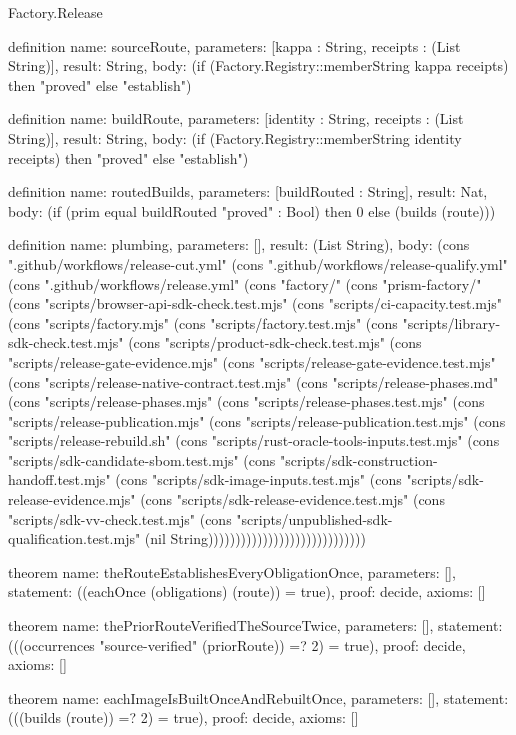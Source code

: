 \begin{lexlean}{Factory.Release}
\begin{semanticmodule}
definition{
  name: sourceRoute,
  parameters: [kappa : String, receipts : (List String)],
  result: String,
  body: (if (Factory.Registry::memberString kappa receipts) then "proved" else "establish")
}

definition{
  name: buildRoute,
  parameters: [identity : String, receipts : (List String)],
  result: String,
  body: (if (Factory.Registry::memberString identity receipts) then "proved" else "establish")
}

definition{
  name: routedBuilds,
  parameters: [buildRouted : String],
  result: Nat,
  body: (if (prim equal buildRouted "proved" : Bool) then 0 else (builds (route)))
}

definition{
  name: plumbing,
  parameters: [],
  result: (List String),
  body: (cons ".github/workflows/release-cut.yml" (cons ".github/workflows/release-qualify.yml" (cons ".github/workflows/release.yml" (cons "factory/" (cons "prism-factory/" (cons "scripts/browser-api-sdk-check.test.mjs" (cons "scripts/ci-capacity.test.mjs" (cons "scripts/factory.mjs" (cons "scripts/factory.test.mjs" (cons "scripts/library-sdk-check.test.mjs" (cons "scripts/product-sdk-check.test.mjs" (cons "scripts/release-gate-evidence.mjs" (cons "scripts/release-gate-evidence.test.mjs" (cons "scripts/release-native-contract.test.mjs" (cons "scripts/release-phases.md" (cons "scripts/release-phases.mjs" (cons "scripts/release-phases.test.mjs" (cons "scripts/release-publication.mjs" (cons "scripts/release-publication.test.mjs" (cons "scripts/release-rebuild.sh" (cons "scripts/rust-oracle-tools-inputs.test.mjs" (cons "scripts/sdk-candidate-sbom.test.mjs" (cons "scripts/sdk-construction-handoff.test.mjs" (cons "scripts/sdk-image-inputs.test.mjs" (cons "scripts/sdk-release-evidence.mjs" (cons "scripts/sdk-release-evidence.test.mjs" (cons "scripts/sdk-vv-check.test.mjs" (cons "scripts/unpublished-sdk-qualification.test.mjs" (nil String)))))))))))))))))))))))))))))
}

theorem{
  name: theRouteEstablishesEveryObligationOnce,
  parameters: [],
  statement: ((eachOnce (obligations) (route)) = true),
  proof: decide{},
  axioms: []
}

theorem{
  name: thePriorRouteVerifiedTheSourceTwice,
  parameters: [],
  statement: (((occurrences "source-verified" (priorRoute)) =? 2) = true),
  proof: decide{},
  axioms: []
}

theorem{
  name: eachImageIsBuiltOnceAndRebuiltOnce,
  parameters: [],
  statement: (((builds (route)) =? 2) = true),
  proof: decide{},
  axioms: []
}


\end{semanticmodule}
\end{lexlean}
